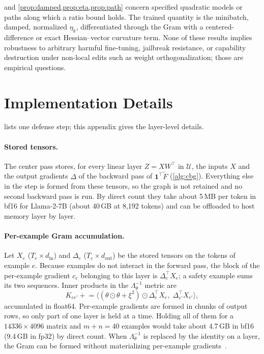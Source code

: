 \documentclass[11pt]{article}
\newcommand{\U}{\mathcal{U}}
\newcommand{\Lam}{\Lambda_{\theta}}
\newcommand{\Ft}{\widetilde{F}}
\newcommand{\etak}{\eta_{k}}
\begin{document}
 and \cref{prop:damped,prop:eta,prop:path} concern specified quadratic models or paths along which a ratio bound holds. The trained quantity is the minibatch, damped, normalized $\etak$, differentiated through the Gram with a centered-difference or exact Hessian--vector curvature term. None of these results implies robustness to arbitrary harmful fine-tuning, jailbreak resistance, or capability destruction under non-local edits such as weight orthogonalization; those are empirical questions.

\section{Implementation Details}
\label{app:impl}

 lists one defense step; this appendix gives the layer-level details.

\paragraph{Stored tensors.}
The center pass stores, for every linear layer $Z=XW^\top$ in $\U$, the inputs $X$ and the output gradients $\Delta$ of the backward pass of $\mathbf 1^\top\Ft$ (\cref{alg:cbg}). Everything else in the step is formed from these tensors, so the graph is not retained and no second backward pass is run. By direct count they take about 5\,MB per token in bf16 for Llama-2-7B (about 40\,GB at 8{,}192 tokens) and can be offloaded to host memory layer by layer.

\paragraph{Per-example Gram accumulation.}
Let $X_e$ ($T_e\times d_{\mathrm{in}}$) and $\Delta_e$ ($T_e\times d_{\mathrm{out}}$) be the stored tensors on the tokens of example $e$. Because examples do not interact in the forward pass, the block of the per-example gradient $c_e$ belonging to this layer is $\Delta_e^\top X_e$; a safety example sums its two sequences. Inner products in the $\Lam^{-1}$ metric are
\begin{equation*}
K_{ee'}\mathrel{+}=\bigl\langle(\theta\odot\theta+\xi^2)\odot\Delta_e^\top X_e,\;\Delta_{e'}^\top X_{e'}\bigr\rangle ,
\end{equation*}
accumulated in float64. Per-example gradients are formed in chunks of output rows, so only part of one layer is held at a time. Holding all of them for a $14336\times4096$ matrix and $m+n=40$ examples would take about 4.7\,GB in bf16 (9.4\,GB in fp32) by direct count. When $\Lam^{-1}$ is replaced by the identity on a layer, the Gram can be formed without materializing per-example gradients~\citep{li2022large}.
\end{document}
